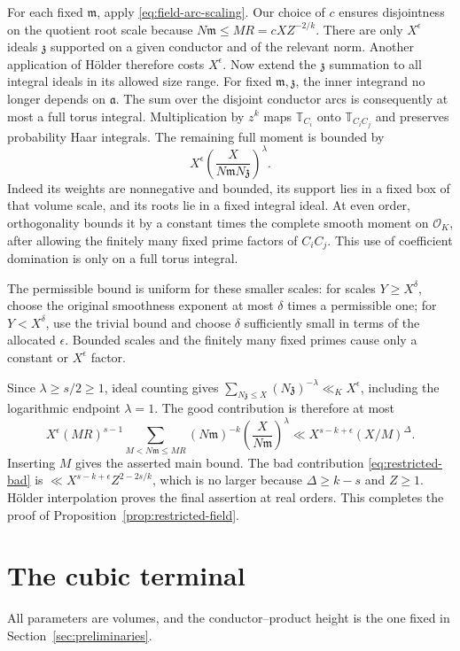 \documentclass[11pt]{amsart}
\theoremstyle{definition}
\numberwithin{equation}{section}
\begin{document}
For each fixed $\mathfrak m$, apply \eqref{eq:field-arc-scaling}.
Our choice of $c$ ensures disjointness on the quotient root scale because
$N\mathfrak m\le MR=cXZ^{-2/k}$.
There are only $X^\epsilon$ ideals $\mathfrak z$ supported on a given
conductor and of the relevant norm.  Another application of H\"older
therefore costs $X^\epsilon$.
Now extend the $\mathfrak z$ summation to all integral ideals in its
allowed size range.  For fixed $\mathfrak m,\mathfrak z$, the inner
integrand no longer depends on $\mathfrak a$.  The sum over the disjoint
conductor arcs is consequently at most a full torus integral.
Multiplication by $z^k$ maps $\mathbb T_{C_i}$ onto
$\mathbb T_{C_iC_j}$ and preserves probability Haar integrals.
The remaining full moment is bounded by
\[
 X^\epsilon\left(\frac{X}{N\mathfrak m N\mathfrak z}\right)^\lambda.
\]
Indeed its weights are nonnegative and bounded, its support lies in a
fixed box of that volume scale, and its roots lie in a fixed integral
ideal.  At even order, orthogonality bounds it by a constant times the
complete smooth moment on $\mathcal O_K$, after allowing the finitely
many fixed prime factors of $C_iC_j$.
This use of coefficient domination is only on a full torus integral.

The permissible bound is uniform for these smaller scales: for scales
$Y\ge X^\delta$, choose the original smoothness exponent at most
$\delta$ times a permissible one; for $Y<X^\delta$, use the trivial
bound and choose $\delta$ sufficiently small in terms of the allocated
$\epsilon$.  Bounded scales and the finitely many fixed primes cause
only a constant or $X^\epsilon$ factor.

Since $\lambda\ge s/2\ge1$, ideal counting gives
$\sum_{N\mathfrak z\le X}(N\mathfrak z)^{-\lambda}\ll_K X^\epsilon$,
including the logarithmic endpoint $\lambda=1$.
The good contribution is therefore at most
\[
 X^\epsilon(MR)^{s-1}
 \sum_{M<N\mathfrak m\le MR}(N\mathfrak m)^{-k}
             \left(\frac{X}{N\mathfrak m}\right)^\lambda
 \ll X^{s-k+\epsilon}(X/M)^\Delta.
\]
Inserting $M$ gives the asserted main bound.
The bad contribution \eqref{eq:restricted-bad} is
$\ll X^{s-k+\epsilon}Z^{2-2s/k}$, which is no larger because
$\Delta\ge k-s$ and $Z\ge1$.
H\"older interpolation proves the final assertion at real orders.
This completes the proof of Proposition~\ref{prop:restricted-field}.

\section{The cubic terminal}
\label{sec:cubic-terminal}
\label{sec:g7-cubic}
All parameters are volumes, and the conductor--product height is the one fixed in Section~\ref{sec:preliminaries}.
\end{document}
